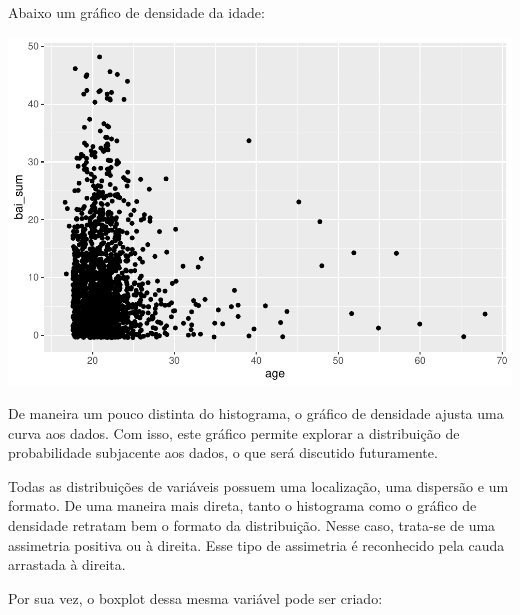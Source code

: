 \documentclass[
]{book}
\newenvironment{Shaded}{\begin{snugshade}}{\end{snugshade}}
\newcommand{\DataTypeTok}[1]{\textcolor[rgb]{0.13,0.29,0.53}{#1}}
\newcommand{\KeywordTok}[1]{\textcolor[rgb]{0.13,0.29,0.53}{\textbf{#1}}}
\newcommand{\NormalTok}[1]{#1}
\newcommand{\OperatorTok}[1]{\textcolor[rgb]{0.81,0.36,0.00}{\textbf{#1}}}
\newcommand{\StringTok}[1]{\textcolor[rgb]{0.31,0.60,0.02}{#1}}
\begin{document}
Abaixo um gráfico de densidade da idade:

\begin{Shaded}
\end{Shaded}

\begin{center}\includegraphics{gitbook-demo_files/figure-latex/unnamed-chunk-23-1} \end{center}

De maneira um pouco distinta do histograma, o gráfico de densidade
ajusta uma curva aos dados. Com isso, este gráfico permite explorar a
distribuição de probabilidade subjacente aos dados, o que será discutido
futuramente.

Todas as distribuições de variáveis possuem uma localização, uma
dispersão e um formato. De uma maneira mais direta, tanto o histograma
como o gráfico de densidade retratam bem o formato da distribuição.
Nesse caso, trata-se de uma assimetria positiva ou à direita. Esse tipo
de assimetria é reconhecido pela cauda arrastada à direita.

Por sua vez, o boxplot dessa mesma variável pode ser criado:

\begin{Shaded}
\end{Shaded}
\end{document}

